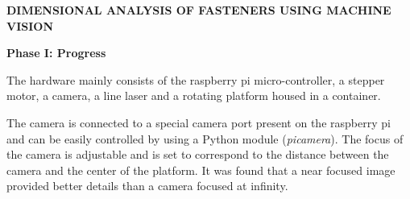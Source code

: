 \documentclass[12pt]{report}
\begin{document}
\begin{center}
\begin{Large}
\textbf{
	DIMENSIONAL ANALYSIS OF FASTENERS USING MACHINE VISION
}
\end{Large}
\end{center}

\begin{large}
\begin{center}
\textbf{
	Phase I: Progress
}
\end{center}
\end{large}

The hardware mainly consists of the raspberry pi micro-controller, a stepper motor, a camera, a line laser and a rotating platform housed in a container.

The camera is connected to a special camera port present on the raspberry pi and can be easily controlled by using a Python module (\emph{picamera}). The focus of the camera is adjustable and is set to correspond to the distance between the camera and the center of the platform. It was found that a near focused image provided better details than a camera focused at infinity.
\end{document}
